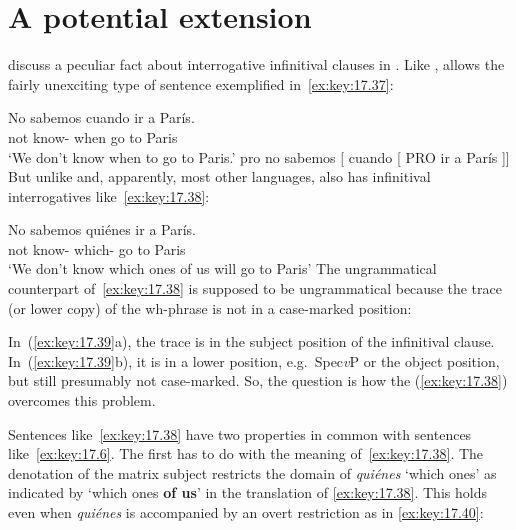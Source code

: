 \documentclass[output=paper]{langsci/langscibook}
\begin{document}
\section{A potential extension}\label{sec:key:17.8}

\citet{BosqueMoreno1984} discuss a peculiar fact about interrogative
infinitival clauses in . Like ,  allows the fairly
unexciting type of sentence exemplified in~\eqref{ex:key:17.37}:

\ea\label{ex:key:17.37}
    \ea
    \gll    No sabemos cuando ir a París.\\
            not know-\Fpl{} when  go to Paris    \\
    \glt    ‘We don’t know when to go to Paris.’
    \ex     pro no sabemos [ cuando [ PRO  ir a París ]]
    \z
\z
But unlike  and, apparently, most other languages,  also has
infinitival interrogatives like~\eqref{ex:key:17.38}:

\ea\label{ex:key:17.38}
    \gll    No sabemos quiénes ir a París.\\
            not  know-\Fpl{} which-\Pl{} go to Paris\\
    \glt    ‘We don’t know which ones of us will go to Paris’
\z
The ungrammatical  counterpart of~\eqref{ex:key:17.38} is supposed to be
ungrammatical because the trace (or lower copy) of the wh-phrase is not in a
case-marked position:

\ea\label{ex:key:17.39}
    \z
\z
In~(\ref{ex:key:17.39}a), the trace is in the subject position of the infinitival
clause. In~(\ref{ex:key:17.39}b), it is in a lower position, e.g.\ Spec\emph{v}P
or the object position, but still presumably not case-marked. So, the question
is how the  (\ref{ex:key:17.38}) overcomes this problem.

Sentences like~\eqref{ex:key:17.38} have two properties in common with
sentences like~\eqref{ex:key:17.6}. The first has to do with the meaning
of~\eqref{ex:key:17.38}.  The denotation of the matrix subject restricts the
domain of \emph{quiénes} ‘which ones’ as indicated by ‘which ones \textbf{of
us}’ in the translation of \eqref{ex:key:17.38}. This holds even when
\emph{quiénes} is accompanied by an overt restriction as in
\eqref{ex:key:17.40}:
\end{document}
